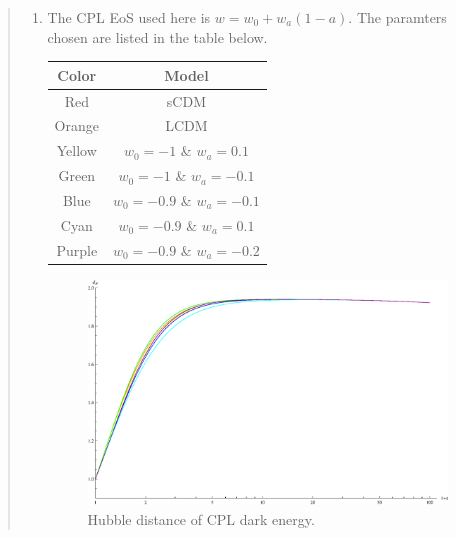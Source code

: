 \documentclass{article}
\begin{document}
\begin{quotation}
{\begin{enumerate}
The growth factors in figure \ref{fig:DE_Supp_GrowthFactors} is plotted within $1+z\sim[0.1,1000]$. As argued in \ref{item:HubbleDistance}, the data is useless when $z<0$ unless one is going to check the future evolution of the universe.
{\bf That is why I give two figures for one quantity sometimes: one for a larger range and one for a suitable range.}



\item

The CPL EoS used here is $w=w_0+w_a(1-a)$. The paramters chosen are listed in the table below.

\vspace{2ex}
\begin{center}
\begin{tabular}{|c|c|}\hline
{\bf Color} & {\bf Model} \\\hline
Red & sCDM \\\hline
Orange & LCDM \\\hline
Yellow & $w_0=-1$ \& $w_a=0.1$ \\ \hline
Green &  $w_0=-1$ \& $w_a=-0.1$ \\ \hline
Blue & $w_0=-0.9$ \& $w_a=-0.1$ \\ \hline
Cyan & $w_0=-0.9$ \& $w_a=0.1$ \\ \hline
Purple & $w_0=-0.9$ \& $w_a=-0.2$ \\ \hline
\end{tabular}
\end{center}
\vspace{2ex}


\begin{figure}[!htpb]
\centering
\includegraphics[width=350pt]{CPL_Supp_HubbleDistances.eps}
\caption{\color{blue}Hubble distance of CPL dark energy.}\label{fig:CPL_Supp_HubbleDistances}
\end{figure}


\end{enumerate}}
\end{quotation}
\end{document}
